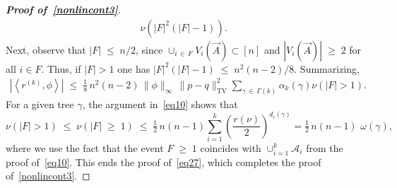 \documentclass[10pt,a4paper]{article}
\renewcommand{\leq}{\;\leqslant\;}
\renewcommand{\geq}{\;\geqslant\;}
\newcommand{\tv}{\mathrm{TV}}
\newcommand{\cA}{\mathcal{A}}
\let\g=\gamma
\let\o=\omega
\begin{document}
\begin{proof}[{\bf Proof of~\eqref{nonlincont3}}]
\begin{align}
\nu\left(|F|^2(|F|-1)\right).
\end{align}
Next, observe that $|F|\leq n/2$, since $\cup_{i\,\in\,F}V_i(\vec A)\subset [n]$ and $|V_i(\vec A)|\geq 2$ for all $i\in F$. Thus, if $|F|>1$ one has $|F|^2(|F|-1)\leq n^2(n-2)/8$. Summarizing,
\begin{align}\label{eq2a87}
\left|\left\langle r^{(k)},\phi\right\rangle\right|\leq \tfrac{1}8\,n^2(n-2)\,\|\phi\|_\infty\,\|p-q\|_{\tv}^2 \sum_{\gamma\,\in\,\Gamma(k)}\alpha_k(\gamma)\nu(|F|>1).
\end{align}
For a given tree $\g$, the argument in~\eqref{eq10} shows that
\[
\nu(|F|>1)
\leq
\nu(|F|\geq 1) \leq
\tfrac12\,n(n-1)\sum_{i=1}^k\left(\frac{r(\nu)}{2}\right)^{d_i(\g)} = \tfrac12\,n(n-1)\,\,\o(\g),
\]
where we use the fact that the event $F\geq 1$ coincides with $\cup_{i=1}^k\cA_i$ from the proof of~\eqref{eq10}. This ends the proof of~\eqref{eq27}, which completes the proof of~\eqref{nonlincont3}.
\end{proof}
\end{document}
